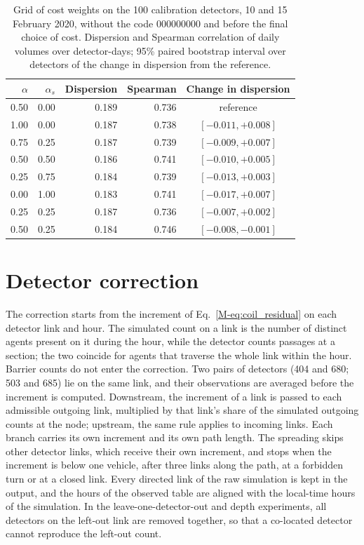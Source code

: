 \documentclass[11pt,a4paper]{article}
\begin{document}




\begin{table}[htbp]
\centering
\caption{Grid of cost weights on the 100 calibration detectors, 10 and 15 February 2020, without the code 000000000 and before the final choice of cost. Dispersion and Spearman correlation of daily volumes over detector-days; 95\% paired bootstrap interval over detectors of the change in dispersion from the reference.}
\label{tab:routing_grid}
\begin{tabular}{@{}rrrrc@{}}
\toprule
$\alpha$ & $\alpha_s$ & Dispersion & Spearman & Change in dispersion \\
\midrule
0.50 & 0.00 & 0.189 & 0.736 & reference \\
1.00 & 0.00 & 0.187 & 0.738 & $[-0.011, +0.008]$ \\
0.75 & 0.25 & 0.187 & 0.739 & $[-0.009, +0.007]$ \\
0.50 & 0.50 & 0.186 & 0.741 & $[-0.010, +0.005]$ \\
0.25 & 0.75 & 0.184 & 0.739 & $[-0.013, +0.003]$ \\
0.00 & 1.00 & 0.183 & 0.741 & $[-0.017, +0.007]$ \\
0.25 & 0.25 & 0.187 & 0.736 & $[-0.007, +0.002]$ \\
0.50 & 0.25 & 0.184 & 0.746 & $[-0.008, -0.001]$ \\
\bottomrule
\end{tabular}
\end{table}

\section{Detector correction}
\label{sec:correction}

The correction starts from the increment of Eq.~\eqref{M-eq:coil_residual} on each detector link and hour. The simulated count on a link is the number of distinct agents present on it during the hour, while the detector counts passages at a section; the two coincide for agents that traverse the whole link within the hour. Barrier counts do not enter the correction. Two pairs of detectors (404 and 680; 503 and 685) lie on the same link, and their observations are averaged before the increment is computed. Downstream, the increment of a link is passed to each admissible outgoing link, multiplied by that link's share of the simulated outgoing counts at the node; upstream, the same rule applies to incoming links. Each branch carries its own increment and its own path length. The spreading skips other detector links, which receive their own increment, and stops when the increment is below one vehicle, after three links along the path, at a forbidden turn or at a closed link. Every directed link of the raw simulation is kept in the output, and the hours of the observed table are aligned with the local-time hours of the simulation. In the leave-one-detector-out and depth experiments, all detectors on the left-out link are removed together, so that a co-located detector cannot reproduce the left-out count.
\end{document}
